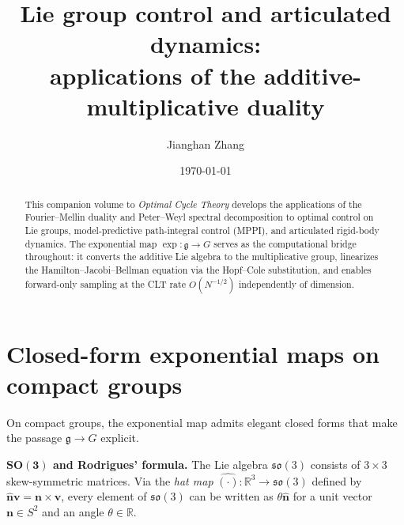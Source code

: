 \documentclass[12pt]{amsart}
\title[Lie Group Control]{Lie group control and articulated dynamics:\\
applications of the additive-multiplicative duality}
\author{Jianghan Zhang}
\date{\today}
\theoremstyle{definition}
\theoremstyle{remark}
\newcommand{\R}{\mathbb{R}}
\begin{document}
\begin{abstract}
This companion volume to \emph{Optimal Cycle Theory} \cite{OCT} develops the applications of the Fourier--Mellin duality and Peter--Weyl spectral decomposition to optimal control on Lie groups, model-predictive path-integral control (MPPI), and articulated rigid-body dynamics. The exponential map $\exp : \mathfrak{g} \to G$ serves as the computational bridge throughout: it converts the additive Lie algebra to the multiplicative group, linearizes the Hamilton--Jacobi--Bellman equation via the Hopf--Cole substitution, and enables forward-only sampling at the CLT rate $O(N^{-1/2})$ independently of dimension.
\end{abstract}

\maketitle

\section{Closed-form exponential maps on compact groups}\label{sec:compact}

On compact groups, the exponential map admits elegant closed forms that make the passage $\mathfrak{g} \to G$ explicit.

\medskip\noindent\textbf{$\boldsymbol{SO(3)}$ and Rodrigues' formula.}
The Lie algebra $\mathfrak{so}(3)$ consists of $3 \times 3$ skew-symmetric matrices. Via the \emph{hat map} $\widehat{(\cdot)} : \R^3 \to \mathfrak{so}(3)$ defined by $\hat{\mathbf{n}}\mathbf{v} = \mathbf{n} \times \mathbf{v}$, every element of $\mathfrak{so}(3)$ can be written as $\theta\hat{\mathbf{n}}$ for a unit vector $\mathbf{n} \in S^2$ and an angle $\theta \in \R$.
\end{document}
